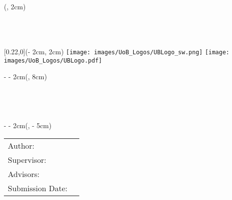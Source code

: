 \begin{titlepage}

	\begin{textblock*}{\textwidth}(\coverborderleft, 2cm)%
		\setlength{\baselineskip}{11pt}%
		\ifx \monochromeCover \undefined
			\textcolor{UniversitaetFarbe} { %
				\fontsize{9}{11}\selectfont%
				\sffamily \chair\\%
				\sffamily \faculty\\%
				\sffamily \uni }
		\else
			\textcolor{black} { %
				\fontsize{9}{11}\selectfont%
				\sffamily \chair\\%
				\sffamily \faculty\\%
				\sffamily \uni }
		\fi
	\end{textblock*}%

	\begin{textblock*}{\UniversitaetLogoHoehe}[0.22,0](\paperwidth - 2cm, 2cm)%
		\ifx \monochromeCoverInside \undefined
			\texttt{[image: images/UoB\_Logos/UBLogo\_sw.png]}%
		\else
			\texttt{[image: images/UoB\_Logos/UBLogo.pdf]}%
		\fi
	\end{textblock*}%

	\begin{textblock*}{\paperwidth - \coverborderleft - 2cm}(\coverborderleft , 8cm)%
		\raggedright %
		{\sffamily \Large \worktype}\\
		{\sffamily \huge \titleFirstLanguage \par} %
		\vspace{1cm}
		\sffamily \Large \textbf{\authorname}\\
	\end{textblock*}
	
	\begin{textblock*}{\paperwidth - \coverborderleft - 2cm}(\coverborderleft, \paperheight - 5cm)%
		\begin{tabular}{l l}
			\sffamily Author:          & \sffamily \authorname     \\
			\sffamily Supervisor:      & \sffamily \supervisor     \\
			\sffamily Advisors:        & \sffamily \advisor        \\
			\sffamily Submission Date: & \sffamily \submissionDate
		\end{tabular}
	\end{textblock*}
	

	~\\ %
\end{titlepage}
